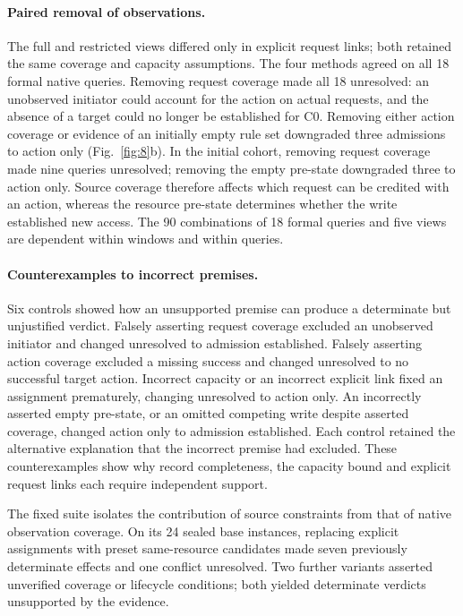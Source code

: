 \paragraph{Paired removal of observations.} The full and restricted views differed only in explicit request links; both retained the same coverage and capacity assumptions. The four methods agreed on all 18 formal native queries. Removing request coverage made all 18 unresolved: an unobserved initiator could account for the action on actual requests, and the absence of a target could no longer be established for C0. Removing either action coverage or evidence of an initially empty rule set downgraded three admissions to action only (Fig.~\ref{fig:8}b). In the initial cohort, removing request coverage made nine queries unresolved; removing the empty pre-state downgraded three to action only. Source coverage therefore affects which request can be credited with an action, whereas the resource pre-state determines whether the write established new access. The 90 combinations of 18 formal queries and five views are dependent within windows and within queries.

\paragraph{Counterexamples to incorrect premises.} Six controls showed how an unsupported premise can produce a determinate but unjustified verdict. Falsely asserting request coverage excluded an unobserved initiator and changed unresolved to admission established. Falsely asserting action coverage excluded a missing success and changed unresolved to no successful target action. Incorrect capacity or an incorrect explicit link fixed an assignment prematurely, changing unresolved to action only. An incorrectly asserted empty pre-state, or an omitted competing write despite asserted coverage, changed action only to admission established. Each control retained the alternative explanation that the incorrect premise had excluded. These counterexamples show why record completeness, the capacity bound and explicit request links each require independent support.

The fixed suite isolates the contribution of source constraints from that of native observation coverage. On its 24 sealed base instances, replacing explicit assignments with preset same-resource candidates made seven previously determinate effects and one conflict unresolved. Two further variants asserted unverified coverage or lifecycle conditions; both yielded determinate verdicts unsupported by the evidence.

